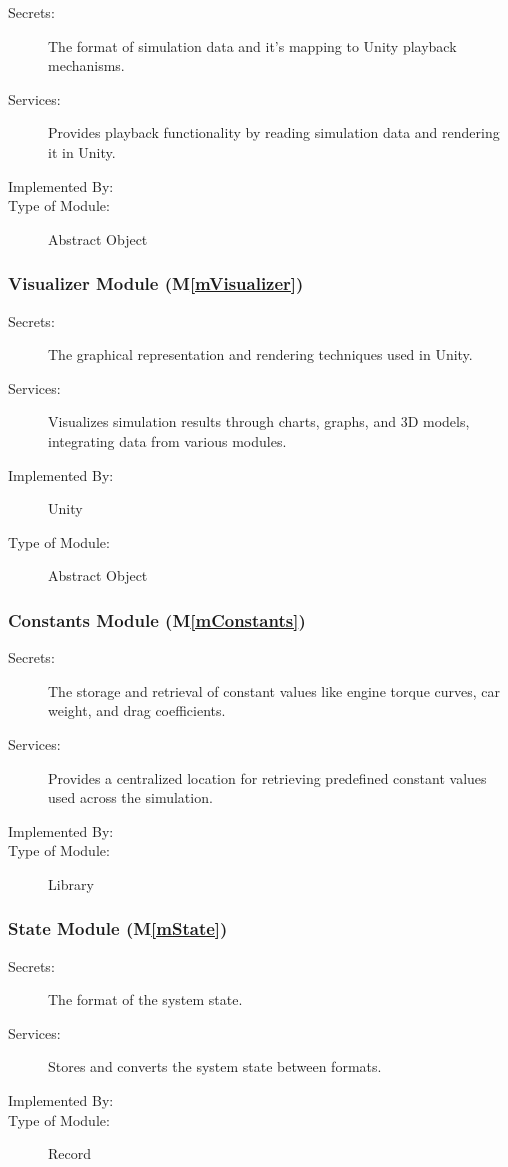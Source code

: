 \documentclass[12pt, titlepage]{article}
\newcommand{\mref}[1]{M\ref{#1}}
\begin{document}
\begin{description}
\item[Secrets:] The format of simulation data and it's mapping to Unity playback mechanisms.
\item[Services:] Provides playback functionality by reading simulation data and rendering it in Unity.
\item[Implemented By:] \progname{}
\item[Type of Module:] Abstract Object
\end{description}

\subsubsection{Visualizer Module (\mref{mVisualizer})}

\begin{description}
\item[Secrets:] The graphical representation and rendering techniques used in Unity.
\item[Services:] Visualizes simulation results through charts, graphs, and 3D models, integrating data from various modules.
\item[Implemented By:] Unity
\item[Type of Module:] Abstract Object
\end{description}

\subsubsection{Constants Module (\mref{mConstants})}

\begin{description}
\item[Secrets:] The storage and retrieval of constant values like engine torque curves, car weight, and drag coefficients.
\item[Services:] Provides a centralized location for retrieving predefined constant values used across the simulation.
\item[Implemented By:] \progname{}
\item[Type of Module:] Library
\end{description}

\subsubsection{State Module (\mref{mState})}

\begin{description}
\item[Secrets:] The format of the system state.
\item[Services:] Stores and converts the system state between formats.
\item[Implemented By:] \progname{}
\item[Type of Module:] Record
\end{description}
\end{document}
